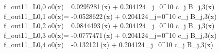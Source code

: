 f_{out11_L0,0	o0}(x)= 0.0295281\,\phi(x) + 0.204124\,\sum_{j=0}^{10} c_j B_{j,3}(x)
f_{out11_L0,1	o0}(x)= -0.0528622\,\phi(x) + 0.204124\,\sum_{j=0}^{10} c_j B_{j,3}(x)
f_{out11_L0,2	o0}(x)= 0.0844493\,\phi(x) + 0.204124\,\sum_{j=0}^{10} c_j B_{j,3}(x)
f_{out11_L0,3	o0}(x)= -0.0777471\,\phi(x) + 0.204124\,\sum_{j=0}^{10} c_j B_{j,3}(x)
f_{out11_L0,4	o0}(x)= -0.132121\,\phi(x) + 0.204124\,\sum_{j=0}^{10} c_j B_{j,3}(x)
